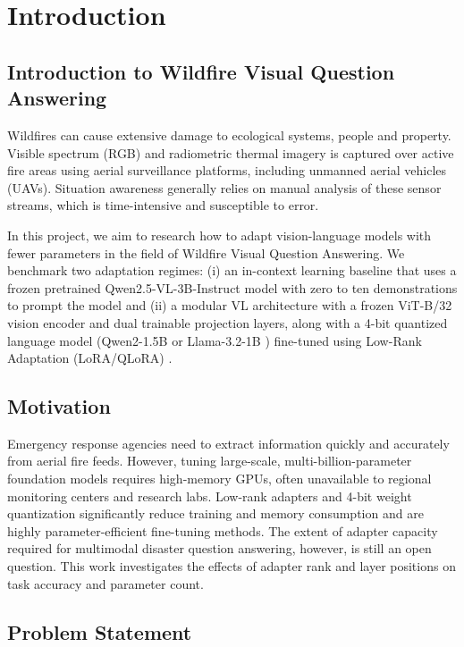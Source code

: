 \documentclass[conference]{IEEEtran}
\begin{document}
\section{Introduction}

\subsection{Introduction to Wildfire Visual Question Answering}

Wildfires can cause extensive damage to ecological systems, people and property. Visible spectrum (RGB) and radiometric thermal imagery is captured over active fire areas using aerial surveillance platforms, including unmanned aerial vehicles (UAVs). Situation awareness generally relies on manual analysis of these sensor streams, which is time-intensive and susceptible to error.

In this project, we aim to research how to adapt vision-language models with fewer parameters in the field of Wildfire Visual Question Answering. We benchmark two adaptation regimes: (i) an in-context learning baseline that uses a frozen pretrained Qwen2.5-VL-3B-Instruct model with zero to ten demonstrations to prompt the model \cite{brown2020,bai2025} and (ii) a modular VL architecture with a frozen ViT-B/32 vision encoder \cite{radford2021} and dual trainable projection layers, along with a 4-bit quantized language model (Qwen2-1.5B \cite{qwen2,mithan} or Llama-3.2-1B \cite{llama32}) fine-tuned using Low-Rank Adaptation (LoRA/QLoRA) \cite{dettmers2023,hu2022}.

\subsection{Motivation}

Emergency response agencies need to extract information quickly and accurately from aerial fire feeds. However, tuning large-scale, multi-billion-parameter foundation models requires high-memory GPUs, often unavailable to regional monitoring centers and research labs. Low-rank adapters and 4-bit weight quantization significantly reduce training and memory consumption and are highly parameter-efficient fine-tuning methods. The extent of adapter capacity required for multimodal disaster question answering, however, is still an open question. This work investigates the effects of adapter rank and layer positions on task accuracy and parameter count.

\subsection{Problem Statement}
\end{document}
